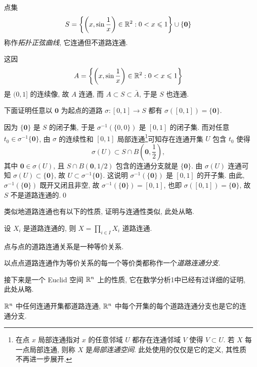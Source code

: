     \begin{Example}[拓扑正弦曲线]
        点集
        \[
            S=\left\{ \left(x,\sin\frac{1}{x}\right)\in\mathbb{R}^2 : 0<x\leqslant 1 \right\}\cup\{\mathbf{0}\}
        \]
        称作\emph{拓扑正弦曲线}, 它连通但不道路连通.
    \end{Example}
    \begin{Proof}
        这因
        \[
            A=\left\{ \left(x,\sin\frac{1}{x}\right)\in\mathbb{R}^2 : 0<x\leqslant 1 \right\}
        \]
        是 $ (0,1] $ 的连续像, 故 $ A $ 连通, 而 $ A\subset S\subset\bar{A} $, 于是 $ S $ 也连通.

        下面证明任意以 $ \mathbf{0} $ 为起点的道路 $ \sigma : [0,1]\to S $ 都有 $ \sigma([0,1])=\{\mathbf{0}\} $.

        因为 $ \{\mathbf{0}\} $ 是 $ S $ 的闭子集, 于是 $ \sigma^{-1}(\{0,0\}) $ 是 $ [0,1] $ 的闭子集. 而对任意 $ t_0\in\sigma^{-1}\{\mathbf{0}\} $, 由 $ \sigma $ 的连续性和 $ [0,1] $ 局部连通\footnote{在点 $ x $ 局部连通指对 
        $ x $ 的任意邻域 $ U $ 都存在连通邻域 $ V $ 使得 $ V\subset U $. 若 $ X $ 每一点局部连通, 则称 $ X $ 是\emph{局部连通空间}. 此处使用的仅仅是它的定义, 其性质不再进一步展开.}可知存在连通开集 $ U $ 包含 $ t_0 $ 使得
        \[
            \sigma(U)\subset S\cap B\left(\mathbf{0},\frac{1}{2}\right),
        \]
        其中 $ \mathbf{0}\in\sigma(U) $, 且 $ S\cap B(\mathbf{0},1/2) $ 包含的连通分支就是 $ \{\mathbf{0}\} $. 由 $ \sigma(U) $ 连通可知 $ \sigma(U)\subset\{\mathbf{0}\} $, 故 $ U\subset\sigma^{-1}\{\mathbf{0}\} $. 这说明 $ \sigma^{-1}(\{\mathbf{0}\}) $ 是 $ [0,1] $ 的开子集. 由此, $ \sigma^{-1}(\{\mathbf{0}\}) $ 既开又闭且非空, 故 $ \sigma^{-1}(\{\mathbf{0}\})=[0,1] $, 也即 $ \sigma([0,1])=\{\mathbf{0}\} $, 故 $ S $ 不是道路连通的.\qed
    \end{Proof}

    类似地道路连通也有以下的性质, 证明与连通性类似, 此处从略.

    \begin{Proposition}[积拓扑的道路连通性]
        设 $ X_i $ 是道路连通的, 则 $ X=\prod_{i\in I}X_i $ 道路连通.
    \end{Proposition}
    
    \begin{Proposition}[点点道路连通]
        点与点的道路连通关系是一种等价关系.
    \end{Proposition}

    \begin{Definition}[道路连通分支]
        以点点道路连通作为等价关系的每一个等价类都称作一个\emph{道路连通分支}.
    \end{Definition}

    接下来是一个 Euclid 空间 $ \mathbb{R}^n $ 上的性质, 它在数学分析1中已经有过详细的证明, 此处从略.

    \begin{Proposition}
        $ \mathbb{R}^n $ 中任何连通开集都道路连通, $ \mathbb{R}^n $ 中每个开集的每个道路连通分支也是它的连通分支.
    \end{Proposition}